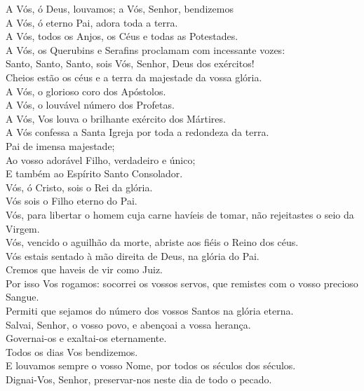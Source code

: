\documentclass{book}
\begin{document}
\begin{flushleft}
    A Vós, ó Deus, louvamos; a Vós, Senhor, bendizemos \\
    A Vós, ó eterno Pai, adora toda a terra. \\
    A Vós, todos os Anjos, os Céus e todas as Potestades. \\
    A Vós, os Querubins e Serafins proclamam com incessante vozes: \\
    Santo, Santo, Santo, sois Vós, Senhor, Deus dos exércitos! \\
    Cheios estão os céus e a terra da majestade da vossa glória. \\
    A Vós, o glorioso coro dos Apóstolos. \\
    A Vós, o louvável número dos Profetas. \\
    A Vós, Vos louva o brilhante exército dos Mártires. \\
    A Vós confessa a Santa Igreja por toda a redondeza da terra. \\
    Pai de imensa majestade; \\
    Ao vosso adorável Filho, verdadeiro e único; \\
    E também ao Espírito Santo Consolador. \\
    Vós, ó Cristo, sois o Rei da glória. \\
    Vós sois o Filho eterno do Pai. \\
    Vós, para libertar o homem cuja carne havíeis de tomar, não rejeitastes o seio da Virgem. \\
    Vós, vencido o aguilhão da morte, abriste aos fiéis o Reino dos céus. \\
    Vós estais sentado à mão direita de Deus, na glória do Pai. \\
    Cremos que haveis de vir como Juiz. \\
    Por isso Vos rogamos: socorrei os vossos servos, que remistes com o vosso precioso Sangue. \\
    Permiti que sejamos do número dos vossos Santos na glória eterna. \\
    Salvai, Senhor, o vosso povo, e abençoai a vossa herança. \\
    Governai-os e exaltai-os eternamente. \\
    Todos os dias Vos bendizemos. \\
    E louvamos sempre o vosso Nome, por todos os séculos dos séculos. \\
    Dignai-Vos, Senhor, preservar-nos neste dia de todo o pecado. \\

\end{flushleft}
\end{document}
